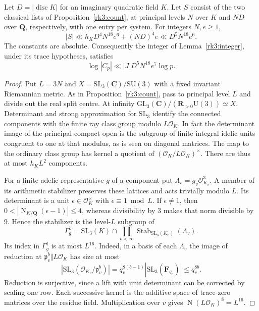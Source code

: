 \begin{corollary}\label{rk3:volume}
Let \(D=|\operatorname{disc}K|\) for an imaginary quadratic field \(K\).
Let \(S\) consist of the two classical lists of
Proposition~\ref{rk3:count}, at principal levels \(N\) over \(K\)
and \(ND\) over \(\mathbf Q\), respectively, with one entry per
system. For integers \(N,e\ge1\),
\[
 |S|\ll h_K D^4 N^{18}e^6+(ND)^4e
       \ll D^5N^{18}e^6 .
\]
The constants are absolute. Consequently the integer of
Lemma~\ref{rk3:integer}, under its trace hypotheses, satisfies
\[
 \log|C_p|\ll |J|D^5N^{18}e^7\log p .
\]
\end{corollary}
\begin{proof}
Put \(L=3N\) and \(X=\mathrm{SL}_3(\mathbf C)/\mathrm{SU}(3)\)
with a fixed invariant Riemannian metric. As in
Proposition~\ref{rk3:count}, pass to principal level \(L\) and
divide out the real split centre. At infinity
\(\mathrm{GL}_3(\mathbf C)/(\mathbf R_{>0}\mathrm U(3))\simeq X\).
Determinant and strong approximation for \(\mathrm{SL}_3\) identify
the connected components with the finite ray class group modulo
\(L\mathcal O_K\). In fact the determinant image of the principal
compact open is the subgroup of finite integral idelic units
congruent to one at that modulus, as is seen on diagonal matrices.
The map to the ordinary class group has kernel a quotient of
\((\mathcal O_K/L\mathcal O_K)^\times\). There are thus at
most \(h_K L^2\) components.

For a finite adelic representative \(g\) of a component put
\(\Lambda_v=g_v\mathcal O_{K_v}^3\). A member of its arithmetic
stabilizer preserves these lattices and acts trivially modulo \(L\).
Its determinant is a unit \(\epsilon\in\mathcal O_K^\times\) with
\(\epsilon\equiv1\bmod L\). If \(\epsilon\ne1\), then
\(0<|\operatorname{N}_{K/\mathbf Q}(\epsilon-1)|\le4\), whereas
divisibility by \(3\) makes that norm divisible by \(9\).
Hence the stabilizer is the level-\(L\) subgroup of
\[
 \Gamma_g^1=\mathrm{SL}_3(K)\cap
          \prod_{v<\infty}\operatorname{Stab}_{\mathrm{SL}_3(K_v)}
                                     (\Lambda_v).
\]
Its index in \(\Gamma_g^1\) is at most \(L^{16}\). Indeed, in a
basis of each \(\Lambda_v\) the image of reduction at
\(\mathfrak p_v^b\Vert L\mathcal O_K\) has size at most
\[
 |\mathrm{SL}_3(\mathcal O_{K_v}/\mathfrak p_v^b)|
 =q_v^{8(b-1)}|\mathrm{SL}_3(\mathbf F_{q_v})|\le q_v^{8b}.
\]
Reduction is surjective, since a lift with unit determinant can be
corrected by scaling one row. Each successive kernel is the additive
space of trace-zero matrices over the residue field. Multiplication
over \(v\) gives \(\operatorname{N}(L\mathcal O_K)^8=L^{16}\).


\end{proof}
